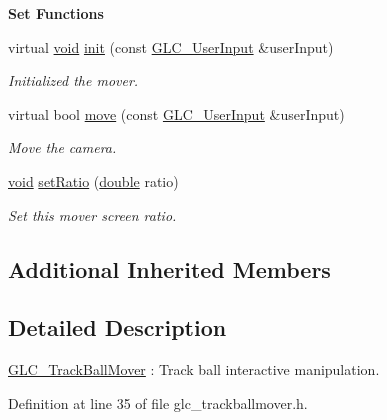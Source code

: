 \begin{Indent}{\bf Set Functions}\par
\begin{DoxyCompactItemize}
\item 
virtual \hyperlink{group___u_a_v_objects_plugin_ga444cf2ff3f0ecbe028adce838d373f5c}{void} \hyperlink{class_g_l_c___track_ball_mover_a876a78986b67739d82d0d7d68b9d860d}{init} (const \hyperlink{class_g_l_c___user_input}{G\-L\-C\-\_\-\-User\-Input} \&user\-Input)
\begin{DoxyCompactList}\small\item\em Initialized the mover. \end{DoxyCompactList}\item 
virtual bool \hyperlink{class_g_l_c___track_ball_mover_a99399ee08f65bcdff03695d6b3f7a56b}{move} (const \hyperlink{class_g_l_c___user_input}{G\-L\-C\-\_\-\-User\-Input} \&user\-Input)
\begin{DoxyCompactList}\small\item\em Move the camera. \end{DoxyCompactList}\item 
\hyperlink{group___u_a_v_objects_plugin_ga444cf2ff3f0ecbe028adce838d373f5c}{void} \hyperlink{class_g_l_c___track_ball_mover_aba7e75d5b0afaa08e8877651560facdb}{set\-Ratio} (\hyperlink{_super_l_u_support_8h_a8956b2b9f49bf918deed98379d159ca7}{double} ratio)
\begin{DoxyCompactList}\small\item\em Set this mover screen ratio. \end{DoxyCompactList}\end{DoxyCompactItemize}
\end{Indent}
\subsection*{Additional Inherited Members}


\subsection{Detailed Description}
\hyperlink{class_g_l_c___track_ball_mover}{G\-L\-C\-\_\-\-Track\-Ball\-Mover} \-: Track ball interactive manipulation. 

Definition at line 35 of file glc\-\_\-trackballmover.\-h.



